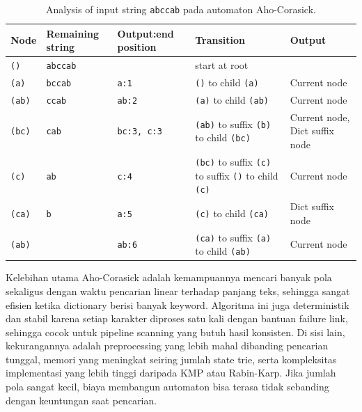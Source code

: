 \begin{table}[H]
    \centering
    \caption{Analysis of input string \texttt{abccab} pada automaton Aho-Corasick.}
    \small
    \setlength{\tabcolsep}{4pt}
    \begin{tabularx}{\textwidth}{>{\raggedright\arraybackslash}p{1.5cm} >{\raggedright\arraybackslash}p{1.8cm} >{\raggedright\arraybackslash}p{2.1cm} >{\raggedright\arraybackslash}X >{\raggedright\arraybackslash}p{3.2cm}}
        \toprule
        Node          & Remaining string & Output:end position & Transition                                                                       & Output                         \\
        \midrule
        \texttt{()}   & \texttt{abccab}  &                     & start at root                                                                    &                                \\
        \texttt{(a)}  & \texttt{bccab}   & \texttt{a:1}        & \texttt{()} to child \texttt{(a)}                                                & Current node                   \\
        \texttt{(ab)} & \texttt{ccab}    & \texttt{ab:2}       & \texttt{(a)} to child \texttt{(ab)}                                              & Current node                   \\
        \texttt{(bc)} & \texttt{cab}     & \texttt{bc:3, c:3}  & \texttt{(ab)} to suffix \texttt{(b)} to child \texttt{(bc)}                      & Current node, Dict suffix node \\
        \texttt{(c)}  & \texttt{ab}      & \texttt{c:4}        & \texttt{(bc)} to suffix \texttt{(c)} to suffix \texttt{()} to child \texttt{(c)} & Current node                   \\
        \texttt{(ca)} & \texttt{b}       & \texttt{a:5}        & \texttt{(c)} to child \texttt{(ca)}                                              & Dict suffix node               \\
        \texttt{(ab)} & \texttt{}        & \texttt{ab:6}       & \texttt{(ca)} to suffix \texttt{(a)} to child \texttt{(ab)}                      & Current node                   \\
        \bottomrule
    \end{tabularx}
\end{table}

Kelebihan utama Aho-Corasick adalah kemampuannya mencari banyak pola sekaligus dengan waktu pencarian linear terhadap panjang teks, sehingga sangat efisien ketika dictionary berisi banyak keyword. Algoritma ini juga deterministik dan stabil karena setiap karakter diproses satu kali dengan bantuan failure link, sehingga cocok untuk pipeline scanning yang butuh hasil konsisten. Di sisi lain, kekurangannya adalah preprocessing yang lebih mahal dibanding pencarian tunggal, memori yang meningkat seiring jumlah state trie, serta kompleksitas implementasi yang lebih tinggi daripada KMP atau Rabin-Karp. Jika jumlah pola sangat kecil, biaya membangun automaton bisa terasa tidak sebanding dengan keuntungan saat pencarian.

